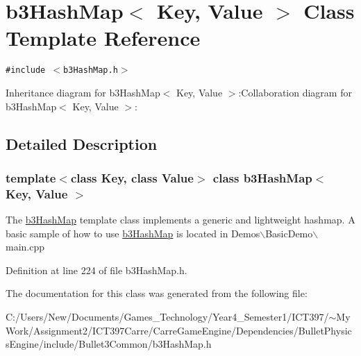 \hypertarget{classb3_hash_map}{
\section{b3HashMap$<$ Key, Value $>$ Class Template Reference}
\label{classb3_hash_map}
}
{\tt \#include $<$b3HashMap.h$>$}

Inheritance diagram for b3HashMap$<$ Key, Value $>$:Collaboration diagram for b3HashMap$<$ Key, Value $>$:

\subsection{Detailed Description}
\subsubsection*{template$<$class Key, class Value$>$ class b3HashMap$<$ Key, Value $>$}

The \hyperlink{classb3_hash_map}{b3HashMap} template class implements a generic and lightweight hashmap. A basic sample of how to use \hyperlink{classb3_hash_map}{b3HashMap} is located in Demos$\backslash$BasicDemo$\backslash$main.cpp 

Definition at line 224 of file b3HashMap.h.

The documentation for this class was generated from the following file:\begin{CompactItemize}
\item 
C:/Users/New/Documents/Games\_\-Technology/Year4\_\-Semester1/ICT397/$\sim$My Work/Assignment2/ICT397Carre/CarreGameEngine/Dependencies/BulletPhysicsEngine/include/Bullet3Common/b3HashMap.h\end{CompactItemize}
